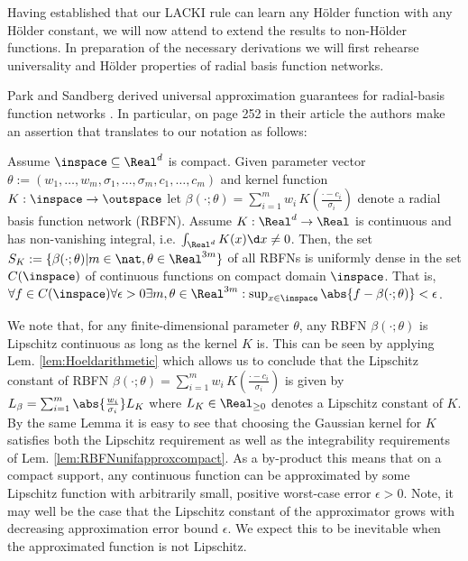 


Having established that our LACKI rule can learn any H\"older function with any H\"older constant, we will now attend to extend the results to non-H\"older functions. In preparation of the necessary derivations we will first rehearse universality and H\"older properties of radial basis function networks. 

Park and Sandberg derived universal approximation guarantees for radial-basis function networks \cite{Park1991}. In particular, on page 252 in their article the authors make an assertion that translates to our notation as follows: 

\begin{lem} \label{lem:RBFNunifapproxcompact} Assume $\inspace \subseteq \Real^d$ is compact. Given parameter  vector $\theta := (w_1,\ldots,w_m,\sigma_1,...,\sigma_m,c_1,\ldots, c_m)$ and kernel function $K: \inspace \to \outspace $ let $\beta(\cdot;\theta ) = \sum_{i=1}^m w_i \, K(\frac{\cdot - c_i}{\sigma_i} )  $ denote a radial basis function network (RBFN). Assume $K: \Real^d \to \Real$ is continuous and has non-vanishing integral, i.e. $\int_{\Real^d} K(x) \d x \neq 0$.
Then, the set $S_K:= \{ \beta(\cdot; \theta) \vert  m \in \nat, \theta \in \Real^{3m}  \}$ of all RBFNs is uniformly dense in the set $C(\inspace)$ of continuous functions on compact domain $\inspace$. That is,  $\forall f \in C(\inspace) \forall \epsilon >0  \exists m, \theta \in \Real^{3m} : \sup_{x \in \inspace}{ \abs{f -\beta(\cdot;\theta)  } } <\epsilon $. 
\end{lem}

\begin{remark} \label{rem:LipconstofRBFN}
We note that, for any finite-dimensional parameter $\theta$, any RBFN $\beta(\cdot;\theta)$ is Lipschitz continuous as long as the kernel $K$ is. This can be seen by applying Lem. \ref{lem:Hoeldarithmetic} which allows us to conclude that the Lipschitz constant of RBFN $\beta(\cdot;\theta ) = \sum_{i=1}^m w_i \, K(\frac{\cdot - c_i}{\sigma_i} ) $ is given by $L_\beta = \sum_{i=1}^m \abs{\frac{w_i}{\sigma_i}} L_{K}$ where $L_K \in \Real_{\geq 0}$ denotes a Lipschitz constant of $K$. By the same Lemma it is easy to see that choosing the Gaussian kernel for $K$ satisfies both the Lipschitz requirement as well as the integrability requirements of Lem. \ref{lem:RBFNunifapproxcompact}. As a by-product this means that on a compact support, any continuous function can be approximated by some Lipschitz function with arbitrarily small, positive worst-case error $\epsilon >0$. Note, it may well be the case that the Lipschitz constant of the approximator grows with decreasing approximation error bound $\epsilon$. We expect this to be inevitable when the approximated function is not Lipschitz.
\end{remark}

